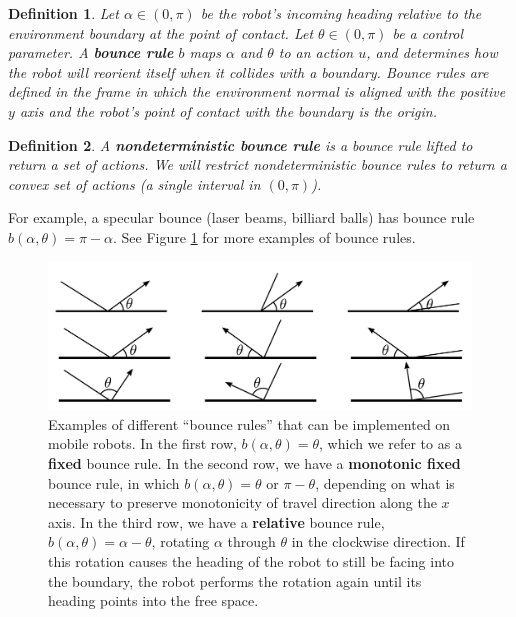 \documentclass[sageh,times,Review]{sagej}
\newtheorem{definition}{Definition}
\begin{document}
\begin{definition}
Let $\alpha \in (0,\pi)$ be the robot's incoming heading relative to the
environment boundary at the point of contact. Let $\theta \in (0,\pi)$ be a control parameter. A 
\textbf{bounce rule} $b$ maps $\alpha$ and $\theta$ to an action
$u$, and determines how the robot will reorient itself when it collides with a
boundary. Bounce rules are defined in the
frame in which the environment normal is aligned with the positive $y$ axis and the
robot's point of contact with the boundary is the origin.
\end{definition}
\begin{definition}
A \textbf{nondeterministic bounce rule} is a bounce rule lifted to return a set of actions. 
We will restrict nondeterministic bounce rules to
return a convex set of actions (a single interval in $(0, \pi)$).
\end{definition}

For example, a specular bounce (laser beams, billiard balls) has bounce rule 
$b(\alpha, \theta) = \pi - \alpha$. See Figure \ref{fig:bex} for more
examples of bounce rules. 

\begin{figure}
    \includegraphics[width=0.9\columnwidth]{bounce_examples.pdf}
    \centering
    \caption[test]{\label{fig:bex}Examples of different ``bounce rules'' that can be implemented on
mobile robots. In the first row, $b(\alpha, \theta) = \theta$, which we refer to
as a \textbf{fixed} bounce rule. In the second row, we have a \textbf{monotonic
fixed} bounce rule, in which
$b(\alpha, \theta) = \theta$ or $\pi-\theta$, depending on what is necessary to
preserve monotonicity of travel direction along the $x$ axis. In the third
row, we have a \textbf{relative} bounce rule, $b(\alpha, \theta) = \alpha - \theta$, rotating $\alpha$ through $\theta$ in the clockwise
direction. If this rotation causes the 
heading of the robot to still be facing into the boundary, the robot 
performs the rotation again until its heading points into the free space.
}
\end{figure}
\end{document}
